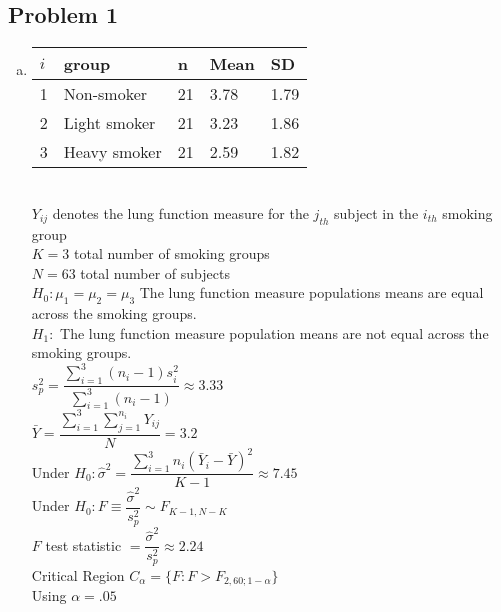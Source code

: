 \documentclass{article}
\begin{document}
\begin{flushleft}

\section*{Problem 1}
\begin{enumerate}[(a)]
\item
\begin{tabular}{l l l l l}
\hline
$i$ & group & n & Mean & SD\\
\hline
1 & Non-smoker & 21 & 3.78 & 1.79\\
2 & Light smoker & 21 & 3.23 & 1.86\\
3 & Heavy smoker & 21 & 2.59 &1.82\\
\hline
\end{tabular}\\
$Y_{ij}$ denotes the lung function measure for the $j_{th}$ subject in the $i_{th}$ smoking group\\

$K=3$ total number of smoking groups\\

$N=63$ total number of subjects\\

$H_0: \mu_1=\mu_2=\mu_3$ The lung function measure populations means are equal across the smoking groups.\\

$H_1:$ The lung function measure population means are not equal across the smoking groups.\\

$s^2_p = \dfrac{\sum_{i=1}^{3}(n_i-1)s_i^2}{\sum_{i=1}^{3}(n_i-1)}\approx 3.33$\\

$\bar{Y} = \dfrac{\sum_{i=1}^{3}\sum_{j=1}^{n_i} Y_{ij} }{N}=3.2$\\

Under $H_0: \hat{\sigma}^2=\dfrac{\sum_{i=1}^{3}n_i(\bar{Y}_i-\bar{Y})^2}{K-1}\approx 7.45$\\

Under $H_0: F \equiv \dfrac{\hat{\sigma}^2}{s^2_p}\sim F_{K-1,N-K}$\\

$F$ test statistic $=\dfrac{\hat{\sigma}^2}{s^2_p}\approx 2.24$\\

Critical Region $C_{\alpha}=\{F:F>F_{2,60;1-\alpha}\}$\\

Using $\alpha=.05$\\


\end{enumerate}
\end{flushleft}
\end{document}
